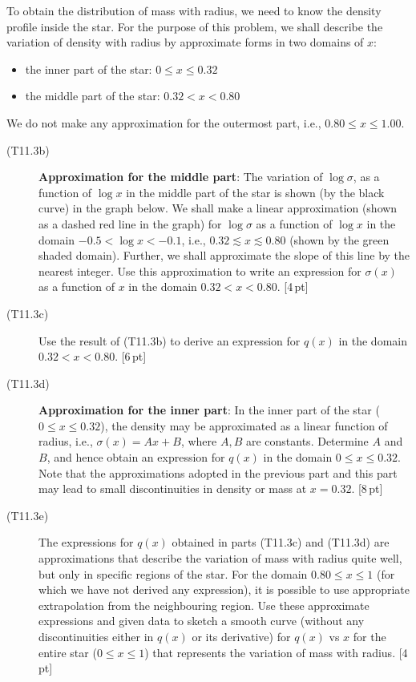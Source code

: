 To obtain the distribution of mass with radius, we need to know the density
profile inside the star. For the purpose of this problem, we shall describe the
variation of density with radius by approximate forms in two domains of $x$:
\begin{itemize}
\item the inner part of the star: $0 \le x \le 0.32$
\item the middle part of the star: $0.32 < x < 0.80$
\end{itemize}
We do not make any approximation for the outermost part, i.e.,
$0.80 \le x \le 1.00$.
\begin{description}
\item[(T11.3b)] \textbf{Approximation for the middle part}: The variation of
  $\log\sigma$, as a function of $\log x$ in the middle part of the star is
  shown (by the black curve) in the graph below. We shall make a linear
  approximation (shown as a dashed red line in the graph) for $\log\sigma$ as a
  function of $\log x$ in the domain $-0.5 < \log x < -0.1$, i.e.,
  $0.32 \lesssim x \lesssim 0.80$ (shown by the green shaded domain). Further,
  we shall approximate the slope of this line by the nearest integer.
  Use this approximation to write an expression for $\sigma(x)$ as a function
  of $x$ in the domain $0.32 < x < 0.80$. \hfill[4\,pt]
\item[(T11.3c)] Use the result of (T11.3b) to derive an expression for $q(x)$
  in the domain $0.32 < x < 0.80$. \hfill[6\,pt]
\item[(T11.3d)] \textbf{Approximation for the inner part}: In the inner part of
  the star ($0 \le x \le 0.32$), the density may be approximated as a linear
  function of radius, i.e., $\sigma(x) = Ax + B$, where $A, B$ are constants.
  Determine $A$ and $B$, and hence obtain an expression for $q(x)$ in the
  domain $0 \le x \le 0.32$. Note that the approximations adopted in the
  previous part and this part may lead to small discontinuities in density or
  mass at $x = 0.32$. \hfill[8\,pt]
\item[(T11.3e)] The expressions for $q(x)$ obtained in parts (T11.3c) and
  (T11.3d) are approximations that describe the variation of mass with radius
  quite well, but only in specific regions of the star. For the domain
  $0.80 \le x \le 1$ (for which we have not derived any expression), it is
  possible to use appropriate extrapolation from the neighbouring region. Use
  these approximate expressions and given data to sketch a smooth curve
  (without any discontinuities either in $q(x)$ or its derivative) for $q(x)$
  vs $x$ for the entire star ($0 \le x \le 1$) that represents the variation of
  mass with radius. \hfill[4\,pt]
\end{description}

